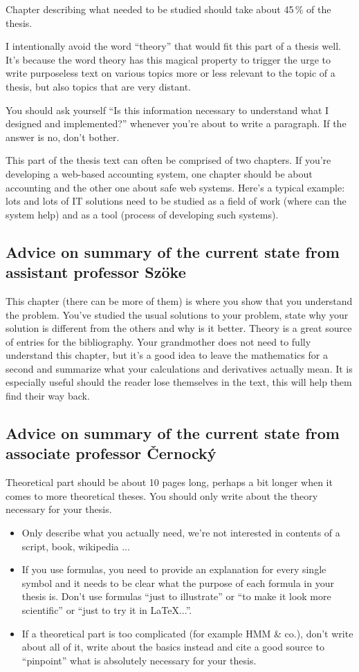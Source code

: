 Chapter describing what needed to be studied should take about 45\,\% of the thesis.

I intentionally avoid the word ``theory'' that would fit this part of a thesis well. It's because the word theory has this magical property to trigger the urge to write purposeless text on various topics more or less relevant to the topic of a thesis, but also topics that are very distant.

You should ask yourself ``Is this information necessary to understand what I designed and implemented?'' whenever you're about to write a paragraph. If the answer is no, don't bother.

This part of the thesis text can often be comprised of two chapters. If you're developing a web-based accounting system, one chapter should be about accounting and the other one about safe web systems. Here's a typical example: lots and lots of IT solutions need to be studied as a field of work (where can the system help) and as a tool (process of developing such systems).


\subsection*{Advice on summary of the current state from assistant professor Szöke}

This chapter (there can be more of them) is where you show that you understand the problem. You've studied the usual solutions to your problem, state why your solution is different from the others and why is it better. Theory is a great source of entries for the bibliography. Your grandmother does not need to fully understand this chapter, but it's a good idea to leave the mathematics for a second and summarize what your calculations and derivatives actually mean. It is especially useful should the reader lose themselves in the text, this will help them find their way back.

\subsection*{Advice on summary of the current state from associate professor Černocký}

Theoretical part should be about 10 pages long, perhaps a bit longer when it comes to more theoretical theses. You should only write about the theory necessary for your thesis.
\begin{itemize}
  \item{Only describe what you actually need, we're not interested in contents of a script, book, wikipedia ...}
  \item{If you use formulas, you need to provide an explanation for every single symbol and it needs to be clear what the purpose of each formula in your thesis is. Don't use formulas ``just to illustrate'' or ``to make it look more scientific'' or ``just to try it in LaTeX...''. }
  \item{If a theoretical part is too complicated (for example HMM \& co.), don't write about all of it, write about the basics instead and cite a good source to ``pinpoint'' what is absolutely necessary for your thesis.}
\end{itemize}


